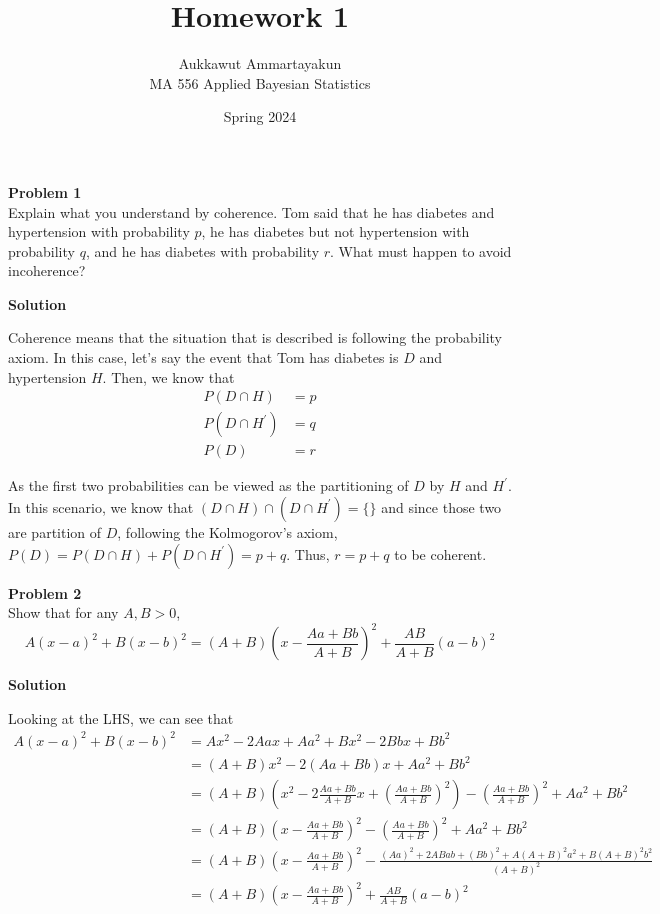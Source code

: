 \documentclass{article}
\title{Homework 1}
\author{Aukkawut Ammartayakun\\MA 556 Applied Bayesian Statistics}
\date{Spring 2024}
\begin{document}
\maketitle
\noindent
\Large{\textbf{Problem 1}}\normalsize
\\


Explain what you understand by coherence. Tom said that he has diabetes and
hypertension with probability $p$, he has diabetes but not hypertension with probability $q$, and he has diabetes with probability $r$. What must happen to avoid incoherence?

\vspace{\baselineskip}
\noindent
\textbf{Solution}

Coherence means that the situation that is described is following the probability axiom. In this case, let's say the event that Tom has diabetes is $D$ and hypertension $H$. Then, we know that
\begin{align*}
    P(D\cap H) &= p\\
    P(D\cap H^{'}) &= q\\
    P(D) &= r
\end{align*}

As the first two probabilities can be viewed as the partitioning of $D$ by $H$ and $H^{'}$. In this scenario, we know that $(D\cap H) \cap (D\cap H^{'}) = \{\}$ and since those two are partition of $D$, following the Kolmogorov's axiom, $P(D) = P(D\cap H) +  P(D\cap H^{'}) = p+q$.
Thus, $r = p + q$ to be coherent.
\vspace{\baselineskip}

\noindent
\Large{\textbf{Problem 2}}\normalsize
\\


Show that for any $A, B > 0$,
\[A(x-a)^2 + B(x-b)^2 = (A+B)\left(x-\frac{Aa+Bb}{A+B}\right)^2 + \frac{AB}{A+B}\left(a-b\right)^2\]

\vspace{\baselineskip}
\noindent
\textbf{Solution}

Looking at the LHS, we can see that
\begin{align*}
    A(x-a)^2 + B(x-b)^2 &= Ax^2 - 2Aax + Aa^2 + Bx^2 - 2Bbx + Bb^2 \\
    &= (A+B)x^2 - 2(Aa+Bb)x + Aa^2 + Bb^2 \\
    &= (A+B)\left(x^2 - 2\frac{Aa+Bb}{A+B} x + \left(\frac{Aa+Bb}{A+B}\right)^2\right) - \left(\frac{Aa+Bb}{A+B}\right)^2 + Aa^2 + Bb^2\\
    &= (A+B)\left(x - \frac{Aa+Bb}{A+B}\right)^2 - \left(\frac{Aa+Bb}{A+B}\right)^2 + Aa^2 + Bb^2\\
    &=  (A+B)\left(x - \frac{Aa+Bb}{A+B}\right)^2 - \frac{(Aa)^2 + 2ABab + (Bb)^2 + A(A+B)^2a^2+ B(A+B)^2b^2}{(A+B)^2} \\
    &=  (A+B)\left(x-\frac{Aa+Bb}{A+B}\right)^2 + \frac{AB}{A+B}\left(a-b\right)^2
\end{align*}
\end{document}
